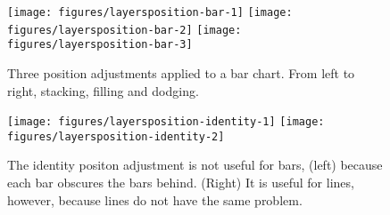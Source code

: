 \begin{Shaded}
\begin{Highlighting}[]
\StringTok{ } 
\StringTok{ }\NormalTok{(} \NormalTok{)}
\StringTok{ }\NormalTok{(} \NormalTok{)}
\StringTok{ }\NormalTok{(} \NormalTok{)}
\end{Highlighting}
\end{Shaded}

\begin{figure}

{\centering \texttt{[image: figures/layersposition-bar-1]} \texttt{[image: figures/layersposition-bar-2]} \texttt{[image: figures/layersposition-bar-3]} 

}

\caption{Three position adjustments applied to a bar chart.  From left to right, stacking, filling and dodging.\label{fig:position-bar}}
\end{figure}

\begin{Shaded}
\begin{Highlighting}[]
\StringTok{ }\NormalTok{(} \NormalTok{)}
 \NormalTok{, } 
  \NormalTok{, }
\end{Highlighting}
\end{Shaded}

\begin{figure}

{\centering \texttt{[image: figures/layersposition-identity-1]} \texttt{[image: figures/layersposition-identity-2]} 

}

\caption{The identity positon adjustment is not useful for bars, (left) because each bar obscures the bars behind.  (Right) It is useful for lines, however, because lines do not have the same problem.\label{fig:position-identity}}
\end{figure}

